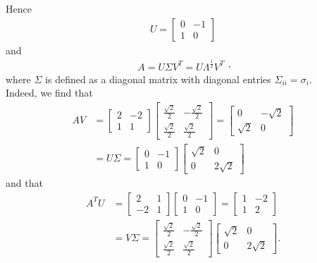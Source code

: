 \documentclass[11pt]{article}
\begin{document}
Hence 
\begin{equation}\begin{split} U = \begin{bmatrix} 0 & -1 \\ 1 & 0\end{bmatrix} \end{split}\nonumber\end{equation} and
\begin{equation}\begin{split} A = U\Sigma V^T = U\Lambda^{\frac12}V^T\end{split},\nonumber\end{equation}
where $\Sigma$ is defined as a diagonal matrix with diagonal entries $\Sigma_{ii} = \sigma_i$.\\[0.3cm]

Indeed, we find that 
\begin{equation}\begin{split} 
AV &= \begin{bmatrix} 2 & -2\\1 & 1\end{bmatrix}\begin{bmatrix} \frac{\sqrt{2}}2 & -\frac{\sqrt{2}}2 \\ \frac{\sqrt{2}}2 & \frac{\sqrt{2}}2 \end{bmatrix} = 
\begin{bmatrix} 0 & -\sqrt{2} \\ \sqrt{2} & 0\end{bmatrix}\\
&= U\Sigma = \begin{bmatrix} 0 & -1\\1 & 0\end{bmatrix}\begin{bmatrix} \sqrt{2} & 0\\0 & 2 \sqrt{2} \end{bmatrix}   
\end{split}\nonumber\end{equation} 
and that
\begin{equation}\begin{split} 
A^TU &= \begin{bmatrix} 2 &1 \\ -2 & 1\end{bmatrix} \begin{bmatrix} 0 & -1\\1 & 0\end{bmatrix} = \begin{bmatrix} 1 & -2\\ 1 & 2\end{bmatrix} \\
&=V\Sigma = \begin{bmatrix} \frac{\sqrt{2}}2 & -\frac{\sqrt{2}}2 \\ \frac{\sqrt{2}}2 & \frac{\sqrt{2}}2 \end{bmatrix} \begin{bmatrix}\sqrt{2} & 0\\0 & 2\sqrt{2}\end{bmatrix}.
\end{split}\nonumber\end{equation} 
\end{document}
